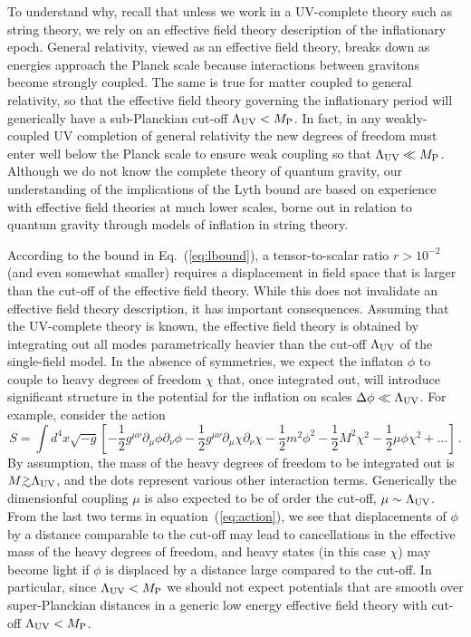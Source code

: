 To understand why, recall that unless we work in a UV-complete theory such as string theory, we rely on an effective field theory description of the inflationary epoch. General relativity, viewed as an effective field theory, breaks down as energies approach the Planck scale because interactions between gravitons become strongly coupled. The same is true for matter coupled to general relativity, so that the effective field theory governing the inflationary period will generically have a sub-Planckian cut-off $\Lambda_{\rm UV}<M_{\rm P}$. In fact, in any weakly-coupled UV completion of general relativity the new degrees of freedom must enter well below the Planck scale to ensure weak coupling so that $\Lambda_{\rm UV}\ll M_{\rm P}$. Although we do not know the complete theory of quantum gravity, our understanding of the implications of the Lyth bound are based on experience with effective field theories at much lower scales, borne out in relation to quantum gravity through models of inflation in string theory.

According to the bound in Eq.~(\ref{eq:lbound}), a tensor-to-scalar ratio $r>10^{-2}$ (and even somewhat smaller) requires a displacement in field space that is larger than the cut-off of the effective field theory. While this does not invalidate an effective field theory description, it has important consequences. Assuming that the UV-complete theory is known, the effective field theory is obtained by integrating out all modes parametrically heavier than the cut-off $\Lambda_{\rm UV}$ of the single-field model. In the absence of symmetries, we expect the inflaton $\phi$ to couple to heavy degrees of freedom $\chi$ that, once integrated out, will introduce significant structure in the potential for the inflation on scales $\Delta\phi\ll \Lambda_{\rm UV}$. For example, consider the action
\begin{equation}\label{eq:action}
S=\int d^4x\sqrt{-g}\left[-\frac12g^{\mu\nu}\partial_\mu\phi\partial_\nu\phi-\frac12g^{\mu\nu}\partial_\mu\chi\partial_\nu\chi-\frac12m^2\phi^2-\frac12M^2\chi^2-\frac12\mu\phi\chi^2+\dots\right]\,.
\end{equation}
By assumption, the mass of the heavy degrees of freedom to be integrated out is $M\gtrsim\Lambda_{\rm UV}$, and the dots represent various other interaction terms. Generically the dimensionful coupling $\mu$ is also expected to be of order the cut-off, $\mu\sim\Lambda_{\rm UV}$. From the last two terms in equation~(\ref{eq:action}), we see that displacements of $\phi$ by a distance comparable to the cut-off may lead to cancellations in the effective mass of the heavy degrees of freedom, and heavy states (in this case $\chi$) may become light if $\phi$ is displaced by a distance large compared to the cut-off. In particular, since $\Lambda_{\rm UV}<M_{\rm P}$ we should not expect potentials that are smooth over super-Planckian distances in a generic low energy effective field theory with cut-off $\Lambda_{\rm UV}<M_{\rm P}$. 

